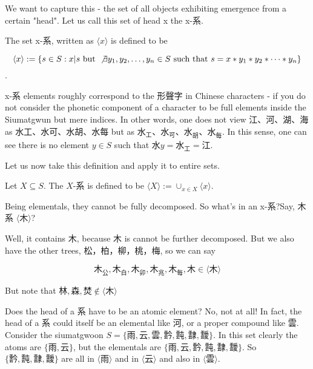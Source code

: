We want to capture this - the set of all objects exhibiting emergence from a certain "head". Let us call this set of head x the x-系. 



\begin{definition}\label{def:hai-elements}
    The set x-系, written as $\langle x \rangle$ is defined to be 
    
    $$\langle x \rangle := \{ s\in S: x|s \text{ but } \not \exists y_1, y_2,\ldots, y_n \in S \text{ such that } s=x*y_1*y_2*\cdots*y_n\}$$. 
    \end{definition}

    x-系 elements roughly correspond to the 形聲字 in Chinese characters - if you do not consider the phonetic component of a character to be full elements inside the Siumatgwun but mere indices. In other words, one does not view 江、河、湖、海 as 水工、水可、水胡、水每 but as $\text{水}_\text{工}、\text{水}_\text{可}、\text{水}_\text{胡}、\text{水}_\text{每}$. In this sense, one can see there is no element $y \in S$ such that $\text{水}y=\text{水}_\text{工}=\text{江}$.
    
    
    Let us now take this definition and apply it to entire sets. 
    
    \begin{definition}[X-系]\label{def:hais-of-sets}
        Let $X\subseteq S$. The $X$-系 is defined to be $\langle X \rangle := \cup_{x\in X} \langle x \rangle$.
    \end{definition}
    
Being elementals, they cannot be fully decomposed. So what's in an x-系?Say, 木系 $\langle \text{木} \rangle$?

Well, it contains $\text{木}$, because $\text{木}$ is cannot be further decomposed. But we also have the other trees, 松，柏，柳，桃，梅, so we can say 

$$\text{木}_{\text{公}},\text{木}_{\text{白}},\text{木}_{\text{卯}},\text{木}_{\text{兆}},\text{木}_{\text{每}},  \text{木} \in \langle \text{木} \rangle$$



But note that $\text{林}, \text{森},  \text{焚} \not\in \langle \text{木} \rangle$

Does the head of a 系 have to be an atomic element? No, not at all! In fact, the head of a 系 could itself be an elemental like 河, or a proper compound like 雲. Consider the siumatgwoon $S = \{\text{雨}, \text{云}, \text{雲}, \text{霒}, \text{霕}, \text{霴}, \text{靉}\}$. In this set clearly the atoms are $\{\text{雨}, \text{云}\}$, but the elementals are $\{\text{雨}, \text{云}, \text{霒}, \text{霕}, \text{霴}, \text{靉}\}$. So $\{\text{霒}, \text{霕}, \text{霴}, \text{靉}\}$ are all in $\langle \text{雨} \rangle$ and in $\langle \text{云} \rangle$ and also in $\langle \text{雲} \rangle$.

